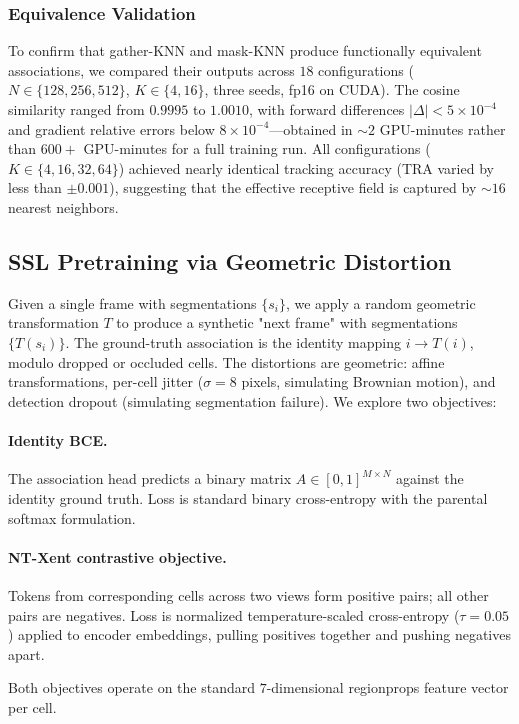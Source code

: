 \subsubsection*{Equivalence Validation}
\label{sec:equiv_val}

To confirm that gather-KNN and mask-KNN produce functionally equivalent associations, we compared their outputs across $18$ configurations ($N \in \{128, 256, 512\}$, $K \in \{4, 16\}$, three seeds, fp16 on CUDA). The cosine similarity ranged from $0.9995$ to $1.0010$, with forward differences $|\Delta| < 5 \times 10^{-4}$ and gradient relative errors below $8 \times 10^{-4}$---obtained in $\sim 2$ GPU-minutes rather than $600+$ GPU-minutes for a full training run. All configurations ($K \in \{4, 16, 32, 64\}$) achieved nearly identical tracking accuracy (TRA varied by less than $\pm 0.001$), suggesting that the effective receptive field is captured by $\sim 16$ nearest neighbors.

\subsection{SSL Pretraining via Geometric Distortion}
\label{sec:ssl}

Given a single frame with segmentations $\{s_i\}$, we apply a random geometric transformation $T$ to produce a synthetic "next frame" with segmentations $\{T(s_i)\}$. The ground-truth association is the identity mapping $i \rightarrow T(i)$, modulo dropped or occluded cells. The distortions are geometric: affine transformations, per-cell jitter ($\sigma = 8$ pixels, simulating Brownian motion), and detection dropout (simulating segmentation failure). We explore two objectives:

\paragraph{Identity BCE.}
The association head predicts a binary matrix $\hat{A} \in [0,1]^{M \times N}$ against the identity ground truth. Loss is standard binary cross-entropy with the parental softmax formulation.

\paragraph{NT-Xent contrastive objective.}
Tokens from corresponding cells across two views form positive pairs; all other pairs are negatives. Loss is normalized temperature-scaled cross-entropy ($\tau = 0.05$) applied to encoder embeddings, pulling positives together and pushing negatives apart.

Both objectives operate on the standard $7$-dimensional regionprops feature vector per cell.
